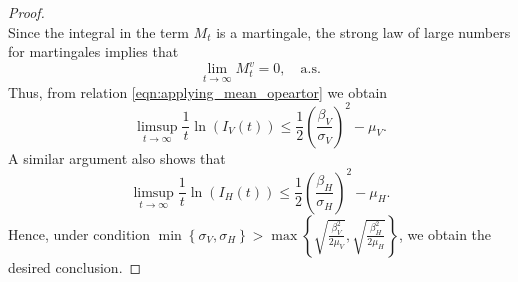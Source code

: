 \begin{proof}
\begin{equation}
    \end{equation}
    Since the integral in the term $M_t$ is a martingale, 
    the strong law of large numbers for martingales 
    {\citet[p. 12, Thm 3.4]{Mao2007}} implies that
    $$
        \lim_{t \to \infty} M_t ^ v = 0, \quad \text{a.s.}
    $$
    Thus, from relation \eqref{eqn:applying_mean_opeartor} 
    we obtain
    \begin{equation} \label{eqn:bound_vector_noise_V}
        \limsup_{t \to \infty} 
            \frac{1}{t}
            \ln(I_V(t)) 
            \leq
            \frac{1}{2}
            \left(
                \frac{\beta_V}{\sigma_V}
            \right) ^ 2
             - \mu_V.
    \end{equation}
    A similar argument also shows that
        \begin{equation}\label{eqn:bound_vector_noise_H}
            \limsup_{t \to \infty} 
                \frac{1}{t}
                \ln(I_H(t)) 
                \leq
                \frac{1}{2}
                \left(
                    \frac{\beta_H}{\sigma_H}
                \right) ^ 2
                - \mu_H.
        \end{equation}
    Hence, under condition
        $
            \displaystyle
            \min
                \left \{
                      \sigma_V, \sigma_H 
                \right\} 
                > 
            \max 
                \left \{
                    \sqrt{
                        \frac{\beta_V ^ 2}{2 \mu_V}
                    },
                    \sqrt{
                        \frac{\beta_H ^ 2}{2 \mu_H}
                    }
                \right \}
        $, 
    we obtain the desired conclusion.
\end{proof}
%
%
%
